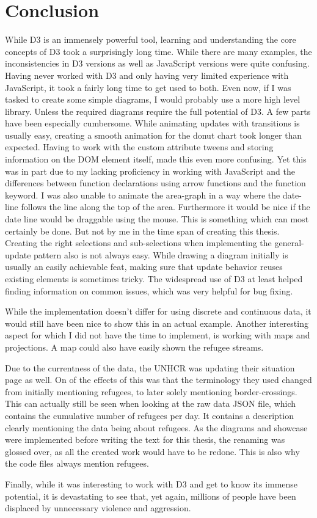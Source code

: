 \chapter{Conclusion}\label{sec:conclusion}

While D3 is an immensely powerful tool, learning and understanding the core concepts of D3 took a surprisingly long time. While there are many examples, the inconsistencies in D3 versions as well as JavaScript versions were quite confusing. Having never worked with D3 and only having very limited experience with JavaScript, it took a fairly long time to get used to both.
Even now, if I was tasked to create some simple diagrams, I would probably use a more high level library. Unless the required diagrams require the full potential of D3.
A few parts have been especially cumbersome. While animating updates with transitions is usually easy, creating a smooth animation for the donut chart took longer than expected. Having to work with the custom attribute tweens and storing information on the DOM element itself, made this even more confusing. Yet this was in part due to my lacking proficiency in working with JavaScript and the differences between function declarations using arrow functions and the function keyword. I was also unable to animate the area-graph in a way where the date-line follows the line along the top of the area. Furthermore it would be nice if the date line would be draggable using the mouse. This is something which can most certainly be done. But not by me in the time span of creating this thesis. Creating the right selections and sub-selections when implementing the general-update pattern also is not always easy. While drawing a diagram initially is usually an easily achievable feat, making sure that update behavior reuses existing elements is sometimes tricky. The widespread use of D3 at least helped finding information on common issues, which was very helpful for bug fixing.

While the implementation doesn't differ for using discrete and continuous data, it would still have been nice to show this in an actual example. Another interesting aspect for which I did not have the time to implement, is working with maps and projections. A map could also have easily shown the refugee streams.

Due to the currentness of the data, the UNHCR was updating their situation page as well. On of the effects of this was that the terminology they used changed from initially mentioning refugees, to later solely mentioning border-crossings. This can actually still be seen when looking at the raw data JSON file, which contains the cumulative number of refugees per day. It contains a description clearly mentioning the data being about refugees. As the diagrams and showcase were implemented before writing the text for this thesis, the renaming was glossed over, as all the created work would have to be redone. This is also why the code files always mention refugees. 

Finally, while it was interesting to work with D3 and get to know its immense potential, it is devastating to see that, yet again, millions of people have been displaced by unnecessary violence and aggression.
